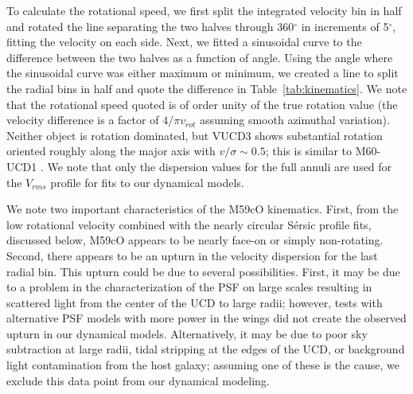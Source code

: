 \documentclass{aastex}
\begin{document}
To calculate the rotational speed, we first split the integrated velocity bin in half and rotated the line separating the two halves through 360$^\circ$ in increments of 5$^\circ$, fitting the velocity on each side. Next, we fitted a sinusoidal curve to the difference between the two halves as a function of angle. Using the angle where the sinusoidal curve was either maximum or minimum, we created a line to split the radial bins in half and quote the difference in Table~\ref{tab:kinematics}. We note that the rotational speed quoted is of order unity of the true rotation value (the velocity difference is a factor of $4/\pi v_{rot}$ assuming smooth azimuthal variation). Neither object is rotation dominated, but VUCD3 shows substantial rotation oriented roughly along the major axis with $v / \sigma \sim 0.5$; this is similar to M60-UCD1 \citep{seth14}.  We note that only the dispersion values for the full annuli are used for the $V_{rms}$ profile for fits to our dynamical models.

We note two important characteristics of the M59cO kinematics. First, from the low rotational velocity combined with the nearly circular S\'ersic profile fits, discussed below, M59cO appears to be nearly face-on or simply non-rotating. Second, there appears to be an upturn in the velocity dispersion for the last radial bin. This upturn could be due to several possibilities. First, it may be due to a problem in the characterization of the PSF on large scales resulting in scattered light from the center of the UCD to large radii; however, tests with alternative PSF models with more power in the wings did not create the observed upturn in our dynamical models. Alternatively, it may be due to poor sky subtraction at large radii, tidal stripping at the edges of the UCD, or background light contamination from the host galaxy; assuming one of these is the cause, we exclude this data point from our dynamical modeling.
\end{document}
